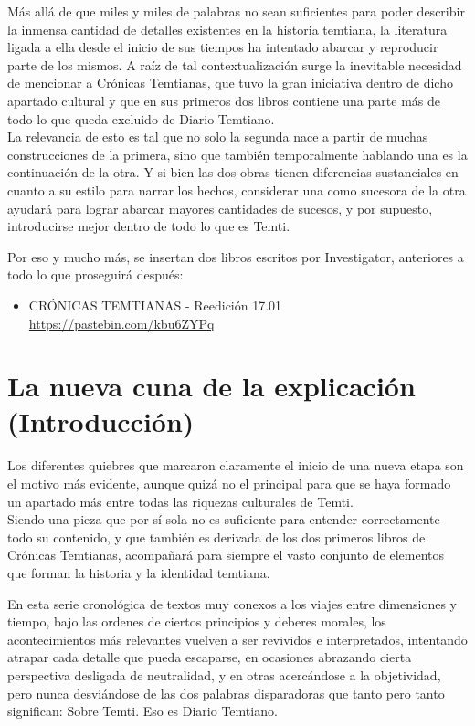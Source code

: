 \documentclass[
  spanish,
]{book}
\providecommand{\tightlist}{%
  \setlength{\itemsep}{0pt}\setlength{\parskip}{0pt}}
\begin{document}
Más allá de que miles y miles de palabras no sean suficientes para poder describir la inmensa cantidad de detalles existentes en la historia temtiana, la literatura ligada a ella desde el inicio de sus tiempos ha intentado abarcar y reproducir parte de los mismos. A raíz de tal contextualización surge la inevitable necesidad de mencionar a Crónicas Temtianas, que tuvo la gran iniciativa dentro de dicho apartado cultural y que en sus primeros dos libros contiene una parte más de todo lo que queda excluido de Diario Temtiano.\\
La relevancia de esto es tal que no solo la segunda nace a partir de muchas construcciones de la primera, sino que también temporalmente hablando una es la continuación de la otra. Y si bien las dos obras tienen diferencias sustanciales en cuanto a su estilo para narrar los hechos, considerar una como sucesora de la otra ayudará para lograr abarcar mayores cantidades de sucesos, y por supuesto, introducirse mejor dentro de todo lo que es Temti.

Por eso y mucho más, se insertan dos libros escritos por Investigator, anteriores a todo lo que proseguirá después:

\begin{itemize}
\tightlist
\item
  CRÓNICAS TEMTIANAS - Reedición 17.01 \url{https://pastebin.com/kbu6ZYPq}
\end{itemize}

\hypertarget{la-nueva-cuna-de-la-explicaciuxf3n-introducciuxf3n}{%
\chapter{La nueva cuna de la explicación (Introducción)}\label{la-nueva-cuna-de-la-explicaciuxf3n-introducciuxf3n}}

Los diferentes quiebres que marcaron claramente el inicio de una nueva etapa son el motivo más evidente, aunque quizá no el principal para que se haya formado un apartado más entre todas las riquezas culturales de Temti.\\
Siendo una pieza que por sí sola no es suficiente para entender correctamente todo su contenido, y que también es derivada de los dos primeros libros de Crónicas Temtianas, acompañará para siempre el vasto conjunto de elementos que forman la historia y la identidad temtiana.

En esta serie cronológica de textos muy conexos a los viajes entre dimensiones y tiempo, bajo las ordenes de ciertos principios y deberes morales, los acontecimientos más relevantes vuelven a ser revividos e interpretados, intentando atrapar cada detalle que pueda escaparse, en ocasiones abrazando cierta perspectiva desligada de neutralidad, y en otras acercándose a la objetividad, pero nunca desviándose de las dos palabras disparadoras que tanto pero tanto significan: Sobre Temti. Eso es Diario Temtiano.
\end{document}

